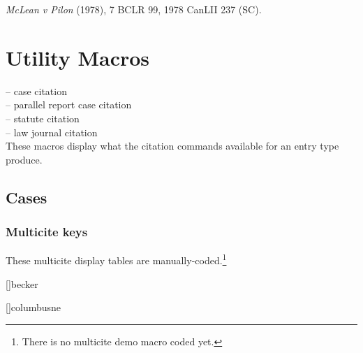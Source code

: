 %
\noindent \textit{McLean v Pilon} (1978), 7 BCLR 99, 1978 CanLII 237 (SC).

\lcsetstylemcgill
\noindent {}



\section{Utility Macros}
\lcsetdemooff
\lcsetindexingoff

 -- case citation\\
 -- parallel report case citation\\
 -- statute citation\\
 -- law journal citation\\

These macros display what the citation commands available for an entry type produce. 

\subsection{Cases}

\bigskip 

\bigskip 

 
\bigskip 

\par
{}
\bigskip 


\subsubsection{Multicite keys}
{\small These multicite display tables are manually-coded.\footnote{There is no multicite demo macro coded yet.}}

\noindent{}[]{becker}

\noindent{}[]{columbusne}

